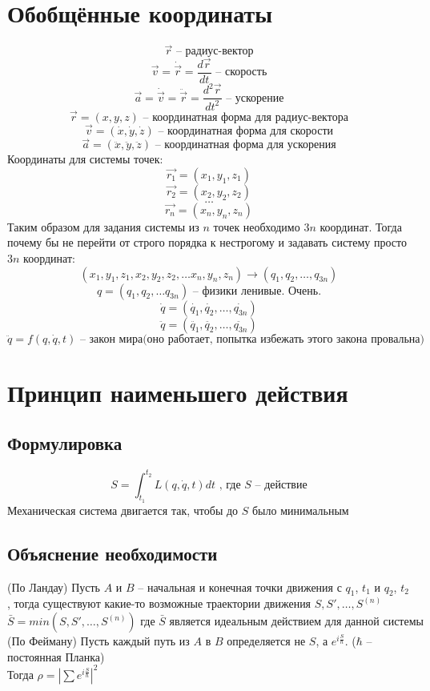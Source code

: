 \documentclass[a4paper, 12pt, titlepage, fleqn]{article}
\newcommand{\T}{\textbf}
\begin{document}
	\begin{titlepage}
	\end{titlepage}
	\section{Обобщённые координаты} 
		\[
			\vec{r} \textbf{ -- радиус-вектор}
		\] 
		\[
			\vec{v} = \dot{\vec{r}} = \frac{d \vec{r}}{dt} \T{ -- скорость}
		\]
		\[
			\vec{a} = \dot{\vec{v}} = \ddot{\vec{r}} = \frac{d^2 \vec{r}}{dt^2} \T{ -- ускорение}
		\]
		\[
			\vec{r} = (x, y, z)  \T{ -- координатная форма для радиус-вектора}
		\]
		\[
			\vec{v} = (\dot{x}, \dot{y}, \dot{z}) \T{ -- координатная форма для скорости}
		\]
		\[
			\vec{a} = (\ddot{x}, \ddot{y}, \ddot{z}) \T{ -- координатная форма для ускорения}
		\]
		Координаты для системы точек:
		\[
			\vec{r_1} = (x_1, y_1, z_1) 
		\]
		\[
			\vec{r_2} = (x_2, y_2, z_2)
		\]
		\[
			\dots
		\]
		\[
			\vec{r_n} = (x_n, y_n, z_n)
		\]
		Таким образом для задания системы из $n$ точек необходимо $3n$ координат. Тогда почему бы не перейти от строго порядка к нестрогому и задавать систему просто $3n$ координат:
		\[
			(x_1, y_1, z_1, x_2, y_2, z_2, \dots x_n, y_n, z_n) \to (q_1, q_2, \dots, q_{3n})
		\]
		\[
			q = (q_1, q_2, \dots q_{3n}) \T{ -- физики ленивые. Очень.}
		\] 
		\[
			\dot{q} = (\dot{q_1}, \dot{q_2}, \dots, \dot{q_{3n}})
		\]
		\[
			\ddot{q} = (\ddot{q_1}, \ddot{q_2}, \dots, \ddot{q_{3n}})
		\]
		\[
			\ddot{q} = f(q, \dot{q}, t) \T{ -- закон мира(оно работает, попытка избежать этого закона провальна)}
		\]
	\section{Принцип наименьшего действия}
		\subsection{Формулировка}
			\[
				S = \int_{t_1}^{t_2} L(q, \dot{q}, t)dt \T{ , где } S \T{ -- действие}
			\]
			Механическая система двигается так, чтобы до $S$ было минимальным
		\subsection{Объяснение необходимости}
			(По Ландау) Пусть $A$ и $B$ -- начальная и конечная точки движения с $q_1$, $t_1$ и $q_2$, $t_2$, тогда существуют какие-то возможные траектории движения $S, S', \dots, S^{(n)}$
			\[
				\bar{S} = min(S, S', \dots, S^{(n)}) \T{ где } \bar{S} \T{ является идеальным действием для данной системы}
			\]
			(По Фейману) Пусть каждый путь из $A$ в $B$ определяется не $S$, а $e^{i\frac{S}{\hbar}}$. ($\hbar$ -- постоянная Планка)\\
			Тогда $\rho = |\sum e^{i\frac{S}{\hbar}}|^2$\\
			
\end{document}
